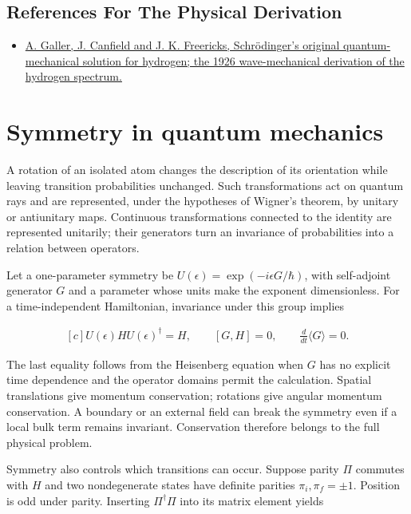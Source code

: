 \documentclass[11pt,oneside]{book}
\newenvironment{centeredalign}{\[\begin{gathered}[c]}{\end{gathered}\]}
\begin{document}
\subsection*{References For The Physical Derivation}
\begin{itemize}
\item \href{https://arxiv.org/abs/2007.14798}{A. Galler, J. Canfield and J. K. Freericks, Schrödinger's original quantum-mechanical solution for hydrogen; the 1926 wave-mechanical derivation of the hydrogen spectrum.}
\end{itemize}





\clearpage

\section{Symmetry in quantum mechanics}

\label{topic:symmetry-in-quantum-mechanics}

A rotation of an isolated atom changes the description of its orientation while leaving transition probabilities unchanged. Such transformations act on quantum rays and are represented, under the hypotheses of Wigner's theorem, by unitary or antiunitary maps. Continuous transformations connected to the identity are represented unitarily; their generators turn an invariance of probabilities into a relation between operators.

Let a one-parameter symmetry be \(U(\epsilon)=\exp(-i\epsilon G/\hbar)\), with self-adjoint generator \(G\) and a parameter whose units make the exponent dimensionless. For a time-independent Hamiltonian, invariance under this group implies

\begin{centeredalign}
U(\epsilon)HU(\epsilon)^\dagger=H,
\qquad [G,H]=0,\qquad \frac{d}{dt}\langle G\rangle=0.
\end{centeredalign}

The last equality follows from the Heisenberg equation when \(G\) has no explicit time dependence and the operator domains permit the calculation. Spatial translations give momentum conservation; rotations give angular momentum conservation. A boundary or an external field can break the symmetry even if a local bulk term remains invariant. Conservation therefore belongs to the full physical problem.

Symmetry also controls which transitions can occur. Suppose parity \(\Pi\) commutes with \(H\) and two nondegenerate states have definite parities \(\pi_i,\pi_f=\pm1\). Position is odd under parity. Inserting \(\Pi^\dagger\Pi\) into its matrix element yields
\end{document}
